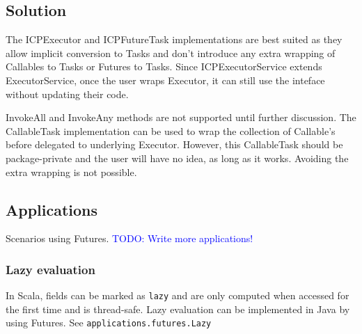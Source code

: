 \subsection{Solution}
The ICPExecutor and ICPFutureTask implementations are best suited as they allow implicit conversion to Tasks
and don't introduce any extra wrapping of Callables to Tasks or Futures to Tasks. Since ICPExecutorService
extends ExecutorService, once the user wraps  Executor, it can still use the inteface without updating
their code.

InvokeAll and InvokeAny methods are not supported until further discussion. The CallableTask implementation
can be used to wrap the collection of Callable's before delegated to underlying  Executor. However,
this CallableTask should be package-private and the user will have no idea, as long as it works. Avoiding
the extra wrapping is not possible.

\subsection{Applications}
Scenarios using Futures.
\textcolor{blue}{TODO: Write more applications!}

\subsubsection{Lazy evaluation}
In Scala, fields can be marked as \lstinline{lazy} and are only computed when accessed for the first time and
is thread-safe. Lazy evaluation can be implemented in Java by using Futures. See \lstinline{applications.futures.Lazy}



